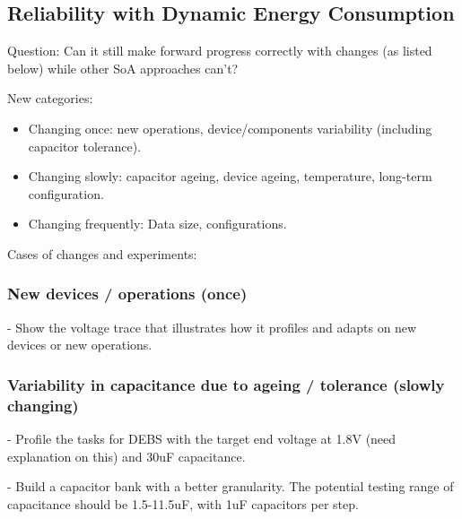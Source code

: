 

% 
% 







\subsection{Reliability with Dynamic Energy Consumption}

Question: Can it still make forward progress correctly with changes (as listed below) while other SoA approaches can't? 


New categories:

\begin{itemize}
    \item Changing once: new operations, device/components variability (including capacitor tolerance).
    \item Changing slowly: capacitor ageing, device ageing, temperature, long-term configuration.
    \item Changing frequently: Data size, configurations. 
\end{itemize}


Cases of changes and experiments:

\subsubsection{New devices / operations (once)}

- Show the voltage trace that illustrates how it profiles and adapts on new devices or new operations. 

\subsubsection{Variability in capacitance due to ageing / tolerance (slowly changing)}

- Profile the tasks for DEBS with the target end voltage at 1.8V (need explanation on this) and 30uF capacitance. 

- Build a capacitor bank with a better granularity. The potential testing range of capacitance should be 1.5-11.5uF, with 1uF capacitors per step. 


